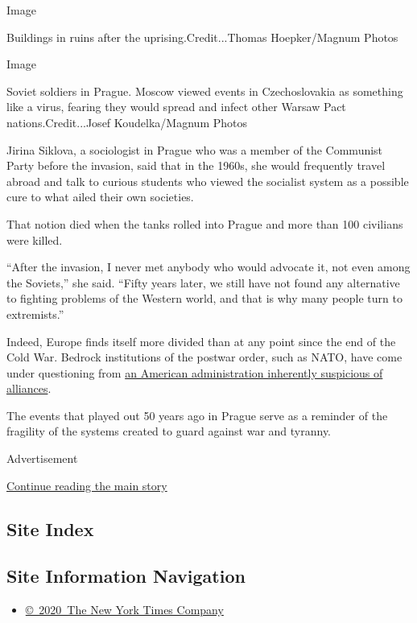 Image

Buildings in ruins after the uprising.Credit...Thomas Hoepker/Magnum
Photos

Image

Soviet soldiers in Prague. Moscow viewed events in Czechoslovakia as
something like a virus, fearing they would spread and infect other
Warsaw Pact nations.Credit...Josef Koudelka/Magnum Photos

Jirina Siklova, a sociologist in Prague who was a member of the
Communist Party before the invasion, said that in the 1960s, she would
frequently travel abroad and talk to curious students who viewed the
socialist system as a possible cure to what ailed their own societies.

That notion died when the tanks rolled into Prague and more than 100
civilians were killed.

``After the invasion, I never met anybody who would advocate it, not
even among the Soviets,'' she said. ``Fifty years later, we still have
not found any alternative to fighting problems of the Western world, and
that is why many people turn to extremists.''

Indeed, Europe finds itself more divided than at any point since the end
of the Cold War. Bedrock institutions of the postwar order, such as
NATO, have come under questioning from
\href{https://www.nytimes.com/2018/07/18/world/europe/trump-nato-self-defense-montenegro.html}{an
American administration inherently suspicious of alliances}.

The events that played out 50 years ago in Prague serve as a reminder of
the fragility of the systems created to guard against war and tyranny.

Advertisement

\protect\hyperlink{after-bottom}{Continue reading the main story}

\hypertarget{site-index}{%
\subsection{Site Index}\label{site-index}}

\hypertarget{site-information-navigation}{%
\subsection{Site Information
Navigation}\label{site-information-navigation}}

\begin{itemize}
\tightlist
\item
  \href{https://help.nytimes.com/hc/en-us/articles/115014792127-Copyright-notice}{©~2020~The
  New York Times Company}
\end{itemize}

